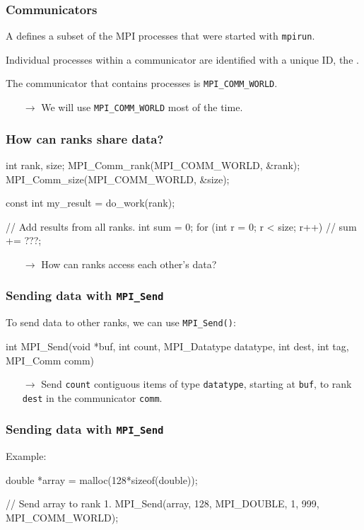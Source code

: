 \documentclass[12pt,t]{beamer}
\let\emph\relax %
\newcommand{\conclude}[1]{%
  \begin{itemize}
    \item[$\rightarrow$]#1
  \end{itemize}
}
\begin{document}
  \begin{frame}[fragile]
    \frametitle{Communicators}

    A \emph{communicator} defines a subset of the MPI processes that were started with \texttt{mpirun}.

    Individual processes within a communicator are identified with a unique ID, the \emph{rank}.

    The communicator that contains \emph{all} processes is \texttt{MPI\_COMM\_WORLD}.
    \conclude{We will use \texttt{MPI\_COMM\_WORLD} most of the time.}
  \end{frame}

  \begin{frame}[fragile]
    \frametitle{How can ranks share data?}

    \begin{code}
int rank, size;
MPI_Comm_rank(MPI_COMM_WORLD, &rank);
MPI_Comm_size(MPI_COMM_WORLD, &size);

const int my_result = do_work(rank);

// Add results from all ranks.
int sum = 0;
for (int r = 0; r < size; r++) {
  // sum += ???;
}

    \end{code}
    \conclude{How can ranks access each other's data?}
  \end{frame}

  \begin{frame}[fragile]
    \frametitle{Sending data with \texttt{MPI\_Send}}

    To send data to other ranks, we can use \texttt{MPI\_Send()}:
    \begin{code}
int MPI_Send(void *buf,
             int count,
             MPI_Datatype datatype,
             int dest,
             int tag,
             MPI_Comm comm)
    \end{code}
    \conclude{Send \texttt{count} contiguous items of type \texttt{datatype}, starting at \texttt{buf}, to rank \texttt{dest} in the communicator \texttt{comm}.}
  \end{frame}

  \begin{frame}[fragile]
    \frametitle{Sending data with \texttt{MPI\_Send}}

    Example:
    \begin{code}
double *array = malloc(128*sizeof(double));

// Send array to rank 1.
MPI_Send(array,
         128,
         MPI_DOUBLE,
         1,
         999,
         MPI_COMM_WORLD);
    \end{code}
  \end{frame}
\end{document}
